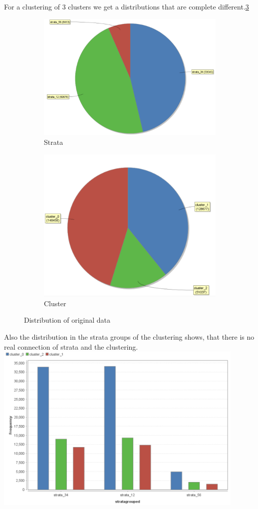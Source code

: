 For a clustering of 3 clusters we get a distributions that are complete different.\ref{fig:OrgDist}
\begin{figure}[h]
\centering
\begin{subfigure}{.5\textwidth}
  \centering
  \includegraphics[width=.4\linewidth]{ClusterOrigRapidStrata2Cluster.PNG}
  \caption{Strata}
  \label{fig:OrgSt}
\end{subfigure}%
\begin{subfigure}{.5\textwidth}
  \centering
  \includegraphics[width=.4\linewidth]{ClusterOrigRapidCluster2Cluster.PNG}
  \caption{Cluster}
  \label{fig:OrgCl}
\end{subfigure}
\caption{Distribution of original data}
\label{fig:OrgDist}
\end{figure}

Also the distribution in the strata groups of the clustering shows, that there is no real connection of strata and the clustering.
\includegraphics[width=0.9\textwidth]{ClusterOrigRapidDistribution2Cluster.PNG}

